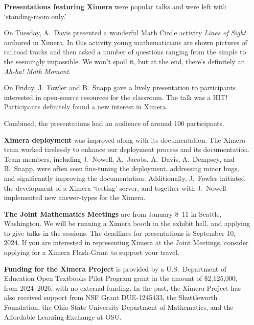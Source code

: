 \documentclass{techbrief}
\begin{document}
\break
\begin{xframe}
    \textbf{Presentations featuring Ximera} were popular talks and were left
    with `standing-room only.'

    On Tuesday, A.\ Davis presented a wonderful Math Circle activity
    \textit{Lines of Sight} authored in Ximera.
    In this activity young mathematicians are shown pictures of railroad tracks
    and then asked a number of questions ranging from the simple to the
    seemingly
    impossible. We won't spoil it, but at the end, there's definitely an
    \textit{Ah-ha! Math Moment}.

    On Friday, J.\ Fowler and B.\ Snapp gave a lively presentation to
    participants interested in open-source resources for the classroom. The
    talk
    was
    a HIT! Participants  definitely found a new interest in Ximera.

    Combined, the presentations had an audience of around 100 participants.
\end{xframe}

\vfil

\begin{xframe}
    \textbf{Ximera deployment} was improved along with its documentation. The
    Ximera team worked tirelessly to enhance our deployment process and its
    documentation. Team members, including J.\ Nowell, A.\ Jacobs, A.\ Davis,
    A.\ Dempsey, and B.\ Snapp, were often seen fine-tuning the deployment,
    addressing minor bugs, and significantly improving the documentation. Additionally,
    J.\ Fowler initiated the development of a Ximera `testing' server, and together
    with J.\ Nowell implemented new answer-types for the Ximera.

\end{xframe}

\vfil

\begin{xframe}
    {\sffamily\bfseries The Joint Mathematics Meetings} are from January 8--11
    in Seattle, Washington. We will be running a Ximera booth in the exhibit
    hall, and applying to give talks in the sessions. The deadlines for
    presentations is September 10, 2024. If you are interested in representing
    Ximera at the
    Joint Meetings, consider applying for a Ximera Flash-Grant to support your
    travel.
\end{xframe}

\vfil

\begin{xframe}
    \textbf{Funding for the Ximera Project} is provided by
    a U.S.\ Department of Education Open Textbooks Pilot Program grant in the
    amount of \$2,125,000, from 2024--2026, with no external funding. In the
    past, the Ximera Project has
    also received support from NSF Grant DUE-1245433, the Shuttleworth
    Foundation, the Ohio State University
    Department of Mathematics, and the Affordable Learning Exchange at OSU.
\end{xframe}
\end{document}
